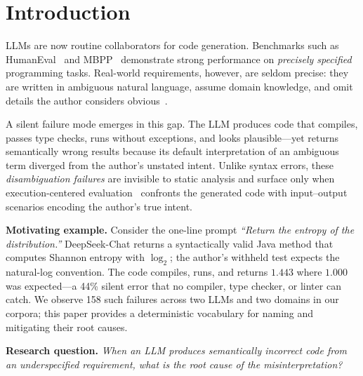 \documentclass[conference]{IEEEtran}
\begin{document}
\section{Introduction}\label{sec:intro}

LLMs are now routine collaborators for code generation. Benchmarks such as HumanEval~\cite{chen2021codex} and MBPP~\cite{austin2021mbpp} demonstrate strong performance on \emph{precisely specified} programming tasks. Real-world requirements, however, are seldom precise: they are written in ambiguous natural language, assume domain knowledge, and omit details the author considers obvious~\cite{berry2008nocuous}.

A silent failure mode emerges in this gap. The LLM produces code that compiles, passes type checks, runs without exceptions, and looks plausible---yet returns semantically wrong results because its default interpretation of an ambiguous term diverged from the author's unstated intent. Unlike syntax errors, these \emph{disambiguation failures} are invisible to static analysis and surface only when execution-centered evaluation~\cite{anonymizedphd} confronts the generated code with input--output scenarios encoding the author's true intent.

\textbf{Motivating example.} Consider the one-line prompt
\emph{``Return the entropy of the distribution.''}
DeepSeek-Chat returns a syntactically valid Java method that computes Shannon entropy with $\log_2$; the author's withheld test expects the natural-log convention. The code compiles, runs, and returns $1.443$ where $1.000$ was expected---a 44\% silent error that no compiler, type checker, or linter can catch. We observe 158 such failures across two LLMs and two domains in our corpora; this paper provides a deterministic vocabulary for naming and mitigating their root causes.

\textbf{Research question.} \emph{When an LLM produces semantically incorrect code from an underspecified requirement, what is the root cause of the misinterpretation?}
\end{document}
